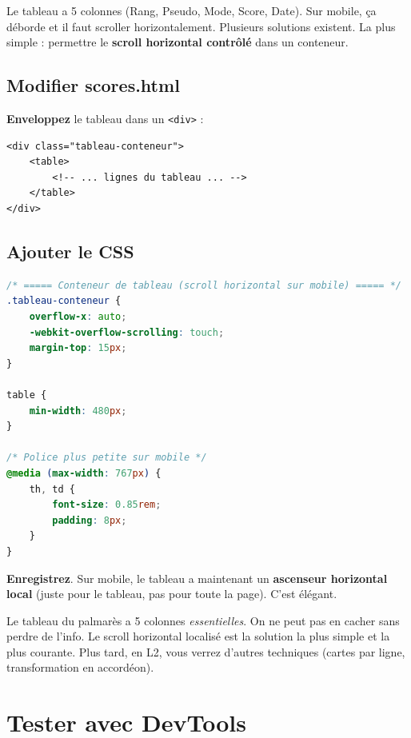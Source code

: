 \documentclass[11pt,a4paper]{article}
\newcommand{\cmark}{\ding{51}}
\begin{document}
Le tableau a 5 colonnes (Rang, Pseudo, Mode, Score, Date). Sur mobile,
ça déborde et il faut scroller horizontalement. Plusieurs solutions
existent. La plus simple : permettre le \textbf{scroll horizontal
contrôlé} dans un conteneur.

\subsection{Modifier scores.html}

\textbf{Enveloppez} le tableau dans un \texttt{<div>} :

\begin{lstlisting}[language=HTML5]
<div class="tableau-conteneur">
    <table>
        <!-- ... lignes du tableau ... -->
    </table>
</div>
\end{lstlisting}

\subsection{Ajouter le CSS}

\begin{lstlisting}[language=CSS]
/* ===== Conteneur de tableau (scroll horizontal sur mobile) ===== */
.tableau-conteneur {
    overflow-x: auto;
    -webkit-overflow-scrolling: touch;
    margin-top: 15px;
}

table {
    min-width: 480px;
}

/* Police plus petite sur mobile */
@media (max-width: 767px) {
    th, td {
        font-size: 0.85rem;
        padding: 8px;
    }
}
\end{lstlisting}

\textbf{Enregistrez}. Sur mobile, le tableau a maintenant un
\textbf{ascenseur horizontal local} (juste pour le tableau, pas pour
toute la page). C'est élégant. \cmark

\begin{retenirbox}
Le tableau du palmarès a 5 colonnes \emph{essentielles}. On ne peut pas
en cacher sans perdre de l'info. Le scroll horizontal localisé est la
solution la plus simple et la plus courante. Plus tard, en L2, vous
verrez d'autres techniques (cartes par ligne, transformation en accordéon).
\end{retenirbox}

\newpage

\section{Tester avec DevTools}
\end{document}
